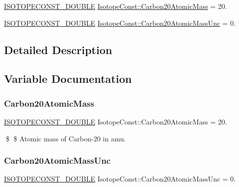 \begin{DoxyCompactItemize}
\item 
\mbox{\hyperlink{group___isotope_const-_macros_ga8f45a7272ce02c0b4c65c44636ed719a}{I\+S\+O\+T\+O\+P\+E\+C\+O\+N\+S\+T\+\_\+\+D\+O\+U\+B\+LE}} \mbox{\hyperlink{group___isotope_const-_carbon-_c20_ga582a3b3ba9122f06f77d6b3642ff40ea}{Isotope\+Const\+::\+Carbon20\+Atomic\+Mass}} = 20.
\item 
\mbox{\hyperlink{group___isotope_const-_macros_ga8f45a7272ce02c0b4c65c44636ed719a}{I\+S\+O\+T\+O\+P\+E\+C\+O\+N\+S\+T\+\_\+\+D\+O\+U\+B\+LE}} \mbox{\hyperlink{group___isotope_const-_carbon-_c20_gaf755d13d73e82f6241112e95bc392f09}{Isotope\+Const\+::\+Carbon20\+Atomic\+Mass\+Unc}} = 0.
\end{DoxyCompactItemize}


\subsection{Detailed Description}


\subsection{Variable Documentation}
\mbox{\label{group___isotope_const-_carbon-_c20_ga582a3b3ba9122f06f77d6b3642ff40ea}} 
\subsubsection{\texorpdfstring{Carbon20\+Atomic\+Mass}{Carbon20AtomicMass}}
{\footnotesize\ttfamily \mbox{\hyperlink{group___isotope_const-_macros_ga8f45a7272ce02c0b4c65c44636ed719a}{I\+S\+O\+T\+O\+P\+E\+C\+O\+N\+S\+T\+\_\+\+D\+O\+U\+B\+LE}} Isotope\+Const\+::\+Carbon20\+Atomic\+Mass = 20.}

\$ \$ Atomic mass of Carbon-\/20 in amu. \mbox{\label{group___isotope_const-_carbon-_c20_gaf755d13d73e82f6241112e95bc392f09}} 
\subsubsection{\texorpdfstring{Carbon20\+Atomic\+Mass\+Unc}{Carbon20AtomicMassUnc}}
{\footnotesize\ttfamily \mbox{\hyperlink{group___isotope_const-_macros_ga8f45a7272ce02c0b4c65c44636ed719a}{I\+S\+O\+T\+O\+P\+E\+C\+O\+N\+S\+T\+\_\+\+D\+O\+U\+B\+LE}} Isotope\+Const\+::\+Carbon20\+Atomic\+Mass\+Unc = 0.}


